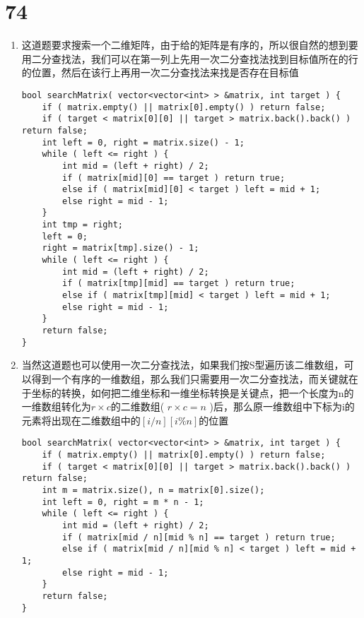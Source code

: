 \documentclass[12pt,a4paper]{article}
\begin{document}
\section{74}
\begin{enumerate}
\item
\begin{CJK}{UTF8}{gbsn}
这道题要求搜索一个二维矩阵，由于给的矩阵是有序的，所以很自然的想到要用二分查找法，我们可以在第一列上先用一次二分查找法找到目标值所在的行的位置，然后在该行上再用一次二分查找法来找是否存在目标值
\end{CJK}
\begin{lstlisting}
bool searchMatrix( vector<vector<int> > &matrix, int target ) {
	if ( matrix.empty() || matrix[0].empty() ) return false;
	if ( target < matrix[0][0] || target > matrix.back().back() ) return false;
	int left = 0, right = matrix.size() - 1;
	while ( left <= right ) {
		int mid = (left + right) / 2;
		if ( matrix[mid][0] == target ) return true;
		else if ( matrix[mid][0] < target ) left = mid + 1;
		else right = mid - 1;
	}
	int tmp = right;
	left = 0;
	right = matrix[tmp].size() - 1;
	while ( left <= right ) {
		int mid = (left + right) / 2;
		if ( matrix[tmp][mid] == target ) return true;
		else if ( matrix[tmp][mid] < target ) left = mid + 1;
		else right = mid - 1;
	}
	return false;
}
\end{lstlisting}
\item
\begin{CJK}{UTF8}{gbsn}
当然这道题也可以使用一次二分查找法，如果我们按S型遍历该二维数组，可以得到一个有序的一维数组，那么我们只需要用一次二分查找法，而关键就在于坐标的转换，如何把二维坐标和一维坐标转换是关键点，把一个长度为n的一维数组转化为$r\times c$的二维数组( $r\times c = n$ )后，那么原一维数组中下标为i的元素将出现在二维数组中的$[i/n][i\%n]$的位置
\end{CJK}
\begin{lstlisting}
bool searchMatrix( vector<vector<int> > &matrix, int target ) {
	if ( matrix.empty() || matrix[0].empty() ) return false;
	if ( target < matrix[0][0] || target > matrix.back().back() ) return false;
	int m = matrix.size(), n = matrix[0].size();
	int left = 0, right = m * n - 1;
	while ( left <= right ) {
		int mid = (left + right) / 2;
		if ( matrix[mid / n][mid % n] == target ) return true;
		else if ( matrix[mid / n][mid % n] < target ) left = mid + 1;
		else right = mid - 1;
	}
	return false;
}
\end{lstlisting}
\end{enumerate}
\end{document}
